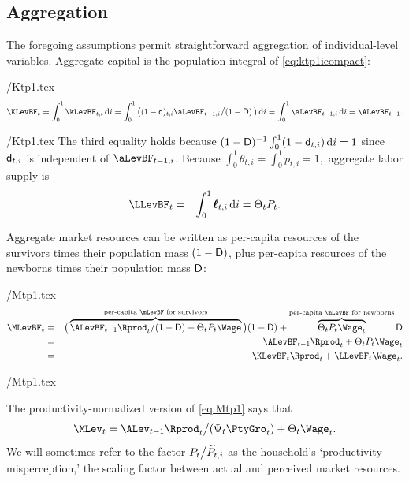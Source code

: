\subsection{Aggregation}

The foregoing assumptions permit straightforward aggregation of individual-level variables.  Aggregate capital is the population integral of \eqref{eq:ktp1icompact}:
\begin{verbatimwrite}{\eq/Ktp1.tex}
  \begin{equation*}
    \KLevBF_{t} = \int_{0}^{1} \kLevBF_{t,i}\,\text{d}i = \int_{0}^{1} \big(\pLives_{t,i}\aLevBF_{t-1,i} \big/\PLives\, \big)\,\text{d}i = \int_{0}^{1} \aLevBF_{t-1,i}\,\text{d}i = \ALevBF_{t-1}.   \label{eq:Ktp1}
  \end{equation*}
\end{verbatimwrite}
 \eq/Ktp1.tex
The third equality holds because $(1-\mathsf{D})^{-1}\int_{0}^{1}(1-\mathsf{d}_{t,i})\,\text{d}i = 1$
since $\mathsf{d}_{t,i}$ is independent of $\aLevBF_{t-1,i}$.
Because $\int_{0}^{1} \theta_{t,i} = \int_{0}^{1} {p}_{t,i} = 1,$ aggregate labor supply
is
\begin{eqnarray*}
  \label{eq:Lt}
  \LLevBF_{t} & = & \int_{0}^{1} \pmb{\ell}_{t,i}\,\text{d}i = \Theta_{t} {P}_{t}.
\end{eqnarray*}

Aggregate market resources can be written as per-capita resources of the survivors times their population mass $(1-\mathsf{D})$, plus per-capita resources of the newborns times their population mass $\mathsf{D}$: 
\begin{verbatimwrite}{\eq/Mtp1.tex}
  \begin{eqnarray}
    \MLevBF_{t} & = & \big(\overbrace{\ALevBF_{t-1} {\Rprod}_t/\PLives  + \Theta_{t} {P}_{t}\Wage}^{\text{per-capita $\mLevBF$ for survivors}}\big)\PLives+\overbrace{\Theta_{t} {P}_{t}\Wage_t}^{\text{per-capita $\mLevBF$ for newborns}} \PDies \nonumber \\
                & = & \ALevBF_{t-1} {\Rprod}_t + \Theta_{t} P_t \Wage_t  \label{eq:Mtp1} \\
                & = & \KLevBF_t \Rprod_t + \LLevBF_t \Wage_t. \nonumber
  \end{eqnarray}
\end{verbatimwrite}
 \eq/Mtp1.tex


The productivity-normalized version of \eqref{eq:Mtp1} says that
\begin{equation}\label{eq:Mtp1norm}
  \MLev_t = \ALev_{t-1} \Rprod_t\big/(\Psi_t \PtyGro_t) + \Theta_t \Wage_t.
\end{equation}
We will sometimes refer to the factor $P_t\big/\widetilde{P}_{t,i}$ as the household's `productivity misperception,' the scaling factor between actual and perceived market resources.


